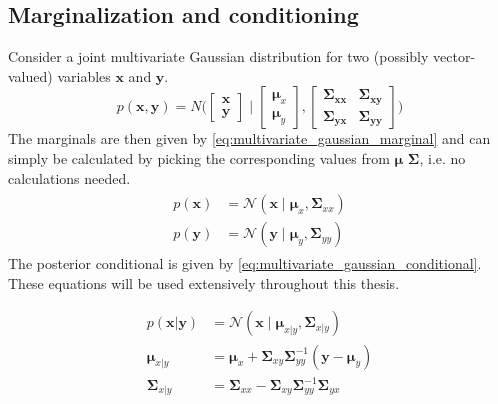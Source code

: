 \subsection{Marginalization and conditioning}
Consider a joint multivariate Gaussian distribution for two (possibly vector-valued) variables $\boldsymbol{x}$ and $\boldsymbol{y}$.
\begin{equation}
    p(\boldsymbol{x}, \boldsymbol{y}) = N\bigg(\begin{bmatrix}
        \boldsymbol{x} \\ \boldsymbol{y}
    \end{bmatrix} \; \bigg| \; \begin{bmatrix}
        \boldsymbol{\mu}_x \\ \boldsymbol{\mu}_y
    \end{bmatrix}, \begin{bmatrix}
        \boldsymbol{\Sigma_{xx}} &
        \boldsymbol{\Sigma_{xy}} \\
        \boldsymbol{\Sigma_{yx}} &
        \boldsymbol{\Sigma_{yy}}
    \end{bmatrix}\bigg)
\end{equation}
The marginals are then given by \cref{eq:multivariate_gaussian_marginal} and can simply be calculated by picking the corresponding values from $\boldsymbol{\mu}$ $\boldsymbol{\Sigma}$, i.e. no calculations needed. 
\begin{align}\label{eq:multivariate_gaussian_marginal}
    \begin{split}
    p(\boldsymbol{x}) &= \mathcal{N}(\boldsymbol{x} \; | \; \boldsymbol{\mu}_x, \boldsymbol{\Sigma}_{xx})\\
    p(\boldsymbol{y}) &= \mathcal{N}(\boldsymbol{y} \; | \; \boldsymbol{\mu}_y, \boldsymbol{\Sigma}_{yy})
    \end{split}
    \end{align}
 The posterior conditional is given by \cref{eq:multivariate_gaussian_conditional}. These equations will be used extensively throughout this thesis.
 \begin{tcolorbox}[title={Posterior Conditional Distribution}]
 \begin{subequations}\label{eq:multivariate_gaussian_conditional}
 \begin{align}
    p(\boldsymbol{x} | \boldsymbol{y}) &= \mathcal{N}(\boldsymbol{x} \; | \; \boldsymbol{\mu}_{x|y}, \boldsymbol{\Sigma}_{x|y})\\
    \boldsymbol{\mu}_{x|y} &= \boldsymbol{\mu}_x + \boldsymbol{\Sigma}_{xy}\boldsymbol{\Sigma}_{yy}^{-1}(\boldsymbol{y} - \boldsymbol{\mu}_y)\\
    \boldsymbol{\Sigma}_{x|y} &= \boldsymbol{\Sigma}_{xx} -\boldsymbol{\Sigma}_{xy}\boldsymbol{\Sigma}_{yy}^{-1}\boldsymbol{\Sigma}_{yx}
 \end{align}
 \end{subequations}
 \end{tcolorbox}


